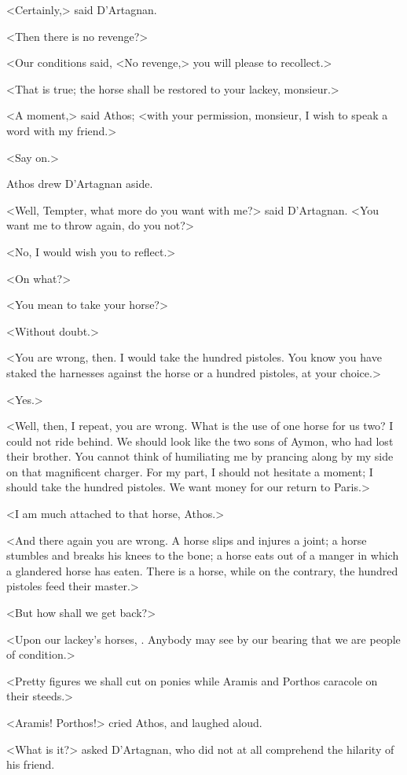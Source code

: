 <Certainly,> said D'Artagnan. 

<Then there is no revenge?> 

<Our conditions said, <No revenge,> you will please to recollect.> 

<That is true; the horse shall be restored to your lackey, monsieur.> 

<A moment,> said Athos; <with your permission, monsieur, I wish to speak a word with my friend.> 

<Say on.> 

Athos drew D'Artagnan aside. 

<Well, Tempter, what more do you want with me?> said D'Artagnan. <You want me to throw again, do you not?> 

<No, I would wish you to reflect.> 

<On what?> 

<You mean to take your horse?> 

<Without doubt.> 

<You are wrong, then. I would take the hundred pistoles. You know you have staked the harnesses against the horse or a hundred pistoles, at your choice.> 

<Yes.> 

<Well, then, I repeat, you are wrong. What is the use of one horse for us two? I could not ride behind. We should look like the two sons of Aymon, who had lost their brother. You cannot think of humiliating me by prancing along by my side on that magnificent charger. For my part, I should not hesitate a moment; I should take the hundred pistoles. We want money for our return to Paris.> 

<I am much attached to that horse, Athos.> 

<And there again you are wrong. A horse slips and injures a joint; a horse stumbles and breaks his knees to the bone; a horse eats out of a manger in which a glandered horse has eaten. There is a horse, while on the contrary, the hundred pistoles feed their master.> 

<But how shall we get back?> 

<Upon our lackey's horses, . Anybody may see by our bearing that we are people of condition.> 

<Pretty figures we shall cut on ponies while Aramis and Porthos caracole on their steeds.> 

<Aramis! Porthos!> cried Athos, and laughed aloud. 

<What is it?> asked D'Artagnan, who did not at all comprehend the hilarity of his friend. 

